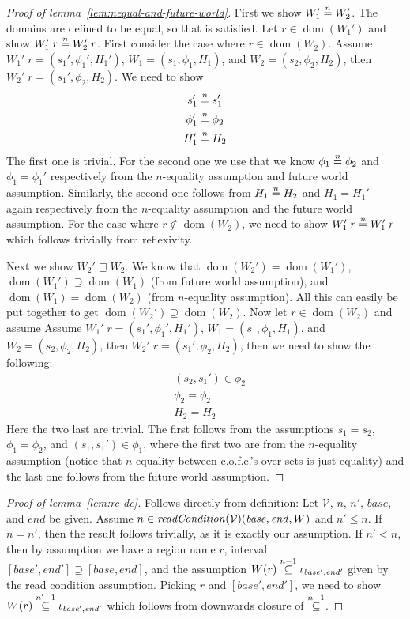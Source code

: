 \documentclass[a4paper]{article}
\newcommand{\nequal}[1][n]{\stackrel{\tiny{#1}}{=}}
\newcommand{\nsubeq}[1][n]{\stackrel{\tiny{#1}}{\subseteq}}
\DeclareMathOperator{\dom}{dom}
\newcommand{\cofe}{c.o.f.e.}
\newcommand{\cofes}{\cofe{}'s}
\newcommand{\var}[1]{\mathit{#1}}
\newcommand{\start}{\var{base}}
\newcommand{\addrend}{\var{end}}
\newcommand{\plainfun}[2]{
  \ifthenelse{\equal{#2}{}}
             {\mathit{#1}}
             {\mathit{#1}(#2)}
}
\newcommand{\readCond}[1]{\plainfun{readCondition}{#1}}
\newcommand{\future}{\mathbin{\sqsupseteq}}
\newcommand{\asmType}{\plaindom{AsmType}}
\newcommand{\plaindom}[1]{\mathrm{#1}}
\newcommand{\intr}[2]{\mathcal{#1}}
\newcommand{\valueintr}[1]{\intr{V}{#1}}
\newcommand{\stdvr}{\valueintr{\asmType}}
\begin{document}
\begin{appendices}
\begin{proof}[Proof of lemma~\ref{lem:nequal-and-future-world}]
First we show $W_1' \nequal W_2'$. The domains are defined to be equal, so that is satisfied. Let $r \in \dom(W_1')$ and show $W_1' \; r \nequal W_2' \; r$. First consider the case where $r \in \dom(W_2)$. Assume $W_1' \; r = (s_1',\phi_1',H_1')$, $W_1 = (s_1,\phi_1,H_1)$, and $W_2 = (s_2,\phi_2,H_2)$, then $W_2' \; r = (s_1',\phi_2,H_2)$. We need to show
\begin{align*}
  s_1' & \nequal s_1' \\
  \phi_1' & \nequal \phi_2 \\
  H_1' & \nequal H_2
\end{align*}
The first one is trivial. For the second one we use that we know $\phi_1 \nequal \phi_2$ and $\phi_1 = \phi_1'$ respectively from the $n$-equality assumption and future world assumption. Similarly, the second one follows from $H_1 \nequal H_2$ and $H_1 = H_1'$ - again respectively from the $n$-equality assumption and the future world assumption. For the case where $r \not\in \dom(W_2)$, we need to show $W_1' \; r \nequal W_1' \; r$ which follows trivially from reflexivity.

Next we show $W_2' \future W_2$. We know that $\dom(W_2') = \dom(W_1')$, $\dom(W_1') \supseteq \dom(W_1)$ (from future world assumption), and $\dom(W_1) = \dom(W_2)$ (from $n$-equality assumption). All this can easily be put together to get $\dom(W_2') \supseteq \dom(W_2)$. Now let $r\in \dom(W_2)$ and assume Assume $W_1' \; r = (s_1',\phi_1',H_1')$, $W_1 = (s_1,\phi_1,H_1)$, and $W_2 = (s_2,\phi_2,H_2)$, then $W_2' \; r = (s_1',\phi_2,H_2)$, then we need to show the following:
\begin{align*}
  &(s_2,s_1') \in \phi_2 \\
  &\phi_2 = \phi_2 \\
  &H_2 = H_2
\end{align*}
Here the two last are trivial. The first follows from the assumptions $s_1 = s_2$, $\phi_1 = \phi_2$, and $(s_1,s_1') \in \phi_1$, where the first two are from the $n$-equality assumption (notice that $n$-equality between \cofes{} over sets is just equality) and the last one follows from the future world assumption.
\end{proof}

\begin{proof}[Proof of lemma~\ref{lem:rc-dc}]
  Follows directly from definition: Let $\stdvr$, $n$, $n'$, $\start$, and  $\addrend$ be given. Assume $n \in \readCond{}(\stdvr)(\start,\addrend,W)$ and $n' \leq n$. If $n=n'$, then the result follows trivially, as it is exactly our assumption. If $n' < n$, then by assumption we have a region name $r$, interval $[\start',\addrend'] \supseteq [\start,\addrend]$, and the assumption $W(r) \nsubeq[n-1] \iota_{\start',\addrend'}$  given by the read condition assumption. Picking $r$ and $[\start',\addrend']$, we need to show  $W(r) \nsubeq[n'-1] \iota_{\start',\addrend'}$ which follows from downwards closure of $\nsubeq[n-1]$.
\end{proof}


\end{appendices}
\end{document}
